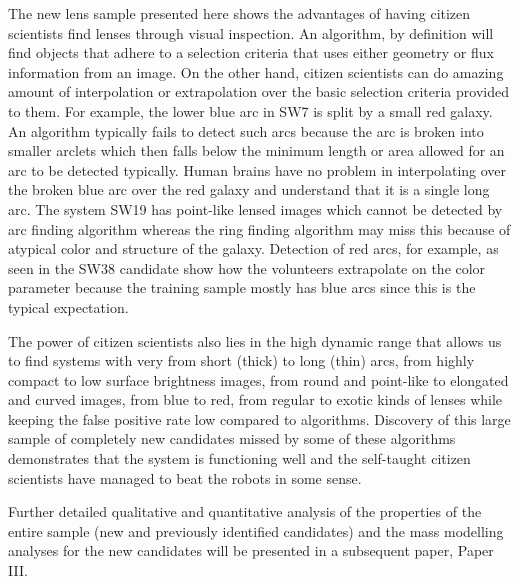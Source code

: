 \documentclass[useAMS,usenatbib,a4paper]{mn2e}
\begin{document}
The new \sw lens sample presented here shows the advantages of having
citizen scientists find lenses through visual inspection. An algorithm,
by definition will find objects that adhere to a selection criteria that
uses either geometry or flux information from an image. On the other
hand, citizen scientists can do amazing amount of interpolation or
extrapolation over the basic selection criteria provided to them.  For
example, the lower blue arc in SW7 is split by a small red galaxy.  An
algorithm typically fails to detect such arcs because the arc is broken
into smaller arclets which then falls below the minimum length or area
allowed for an arc to be detected typically. Human brains have no
problem in interpolating over the broken blue arc over the red galaxy
and understand that it is a single long arc. The system SW19 has
point-like lensed images which cannot be detected by arc finding
algorithm whereas the ring finding algorithm may miss this because of
atypical color and structure of the galaxy. Detection of red arcs, for
example, as seen in the SW38 candidate show how the volunteers
extrapolate on the color parameter because the training sample mostly
has blue arcs since this is the typical expectation.

The power of citizen scientists also lies in the high dynamic range that
allows us to find systems with very from short (thick) to long (thin)
arcs, from highly compact to low surface brightness images, from round
and point-like to elongated and curved images, from blue to red, from
regular to exotic kinds of lenses while keeping the false positive rate
low compared to algorithms. Discovery of this large sample of completely
new candidates missed by some of these algorithms demonstrates that the
\sw system is functioning well and the self-taught citizen scientists
have managed to beat the robots in some sense. 

Further detailed qualitative and quantitative analysis of the properties
of the entire \sw sample (new and previously identified candidates) and
the mass modelling analyses for the new candidates will be presented in
a subsequent \sw paper, Paper III.



\end{document}
